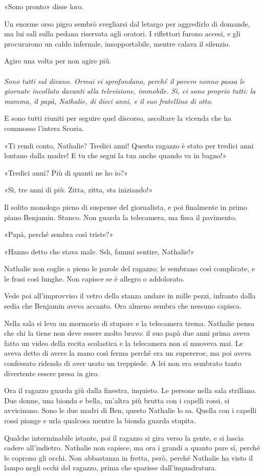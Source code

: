 \documentclass[a4paper,12pt]{book}
\begin{document}
«Sono pronto» disse loro.

Un enorme orso pigro sembrò svegliarsi dal letargo per aggredirlo di domande,
ma lui salì sulla pedana riservata agli oratori. I riflettori furono accesi, e
gli procurarono un caldo infernale, insopportabile, mentre calava il silenzio.

Agire una volta per non agire più.

\paragraph{}
{\itshape
Sono tutti sul divano. Ormai vi sprofondano, perché il povero nonno passa le
giornate incollato davanti alla televisione, immobile. Sì, ci sono proprio
tutti: la mamma, il papà, Nathalie, di dieci anni, e il suo fratellino di otto.

E sono tutti riuniti per seguire quel discorso, ascoltare la vicenda che ha
commosso l’intera Scozia.

«Ti rendi conto, Nathalie? Tredici anni! Questo ragazzo è stato per tredici
anni lontano dalla madre! E tu che segui la tua anche quando va in bagno!»

«Tredici anni? Più di quanti ne ho io?»

«Sì, tre anni di più. Zitta, zitta, sta iniziando!»

Il solito monologo pieno di suspense del giornalista, e poi finalmente in primo
piano Benjamin. Stanco. Non guarda la telecamera, ma fissa il pavimento.

«Papà, perché sembra così triste?»

«Hanno detto che stava male. Ssh, fammi sentire, Nathalie!»

Nathalie non coglie a pieno le parole del ragazzo; le sembrano così complicate,
e le frasi così lunghe. Non capisce se è allegro o addolorato.

Vede poi all’improvviso il vetro della stanza andare in mille pezzi, infranto
dalla sedia che Benjamin aveva accanto. Ora almeno sembra che nessuno capisca.

Nella sala si leva un mormorio di stupore e la telecamera trema. Nathalie pensa
che chi la tiene non deve essere molto bravo: il suo papà due anni prima aveva
fatto un video della recita scolastica e la telecamera non si muoveva mai. Le
aveva detto di avere la mano così ferma perché era un supereroe, ma poi aveva
confessato ridendo di aver usato un treppiede. A lei non era sembrato tanto
divertente essere presa in giro.

Ora il ragazzo guarda giù dalla finestra, inquieto. Le persone nella sala
strillano. Due donne, una bionda e bella, un’altra più brutta con i capelli
rossi, si avvicinano. Sono le due madri di Ben, questo Nathalie lo sa. Quella
con i capelli rossi piange e urla qualcosa mentre la bionda guarda stupita.

Qualche interminabile istante, poi il ragazzo si gira verso la gente, e si
lascia cadere all’indietro. Nathalie non capisce, ma ora i grandi a quanto
pare sì, perché le coprono gli occhi. Non abbastanza in fretta, però, perché
Nathalie ha visto il lampo negli occhi del ragazzo, prima che sparisse
dall’inquadratura.
\/}

\tableofcontents
\end{document}
